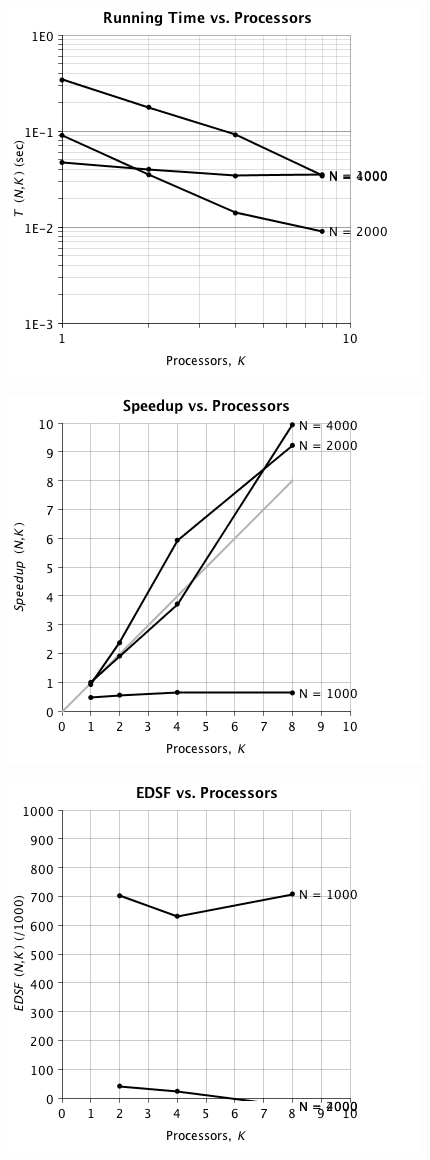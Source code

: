 \documentclass{dependencies/acm_proc_article-sp}
\begin{document}
\begin{center}
\includegraphics[scale=0.5]{images/matrix-vector/running-vs-proc.png}
\end{center}
\begin{center}
\includegraphics[scale=0.5]{images/matrix-vector/speedup-vs-proc.png}
\end{center}
\begin{center}
\includegraphics[scale=0.5]{images/matrix-vector/esdf-vs-proc.png}
\end{center}
\end{document}
